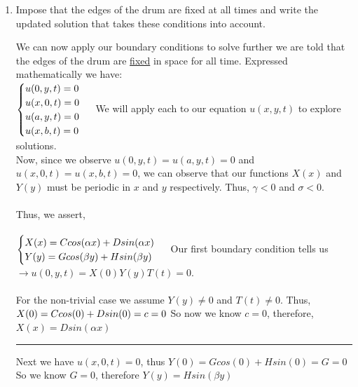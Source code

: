 \documentclass[fleqn]{article}
\begin{document}
\begin{enumerate}
\begin{enumerate}
    \item Impose that the edges of the drum are fixed at all times and write the updated solution that takes these conditions into account.

      \textcolor{hwColor}{ 
         We can now apply our boundary conditions to solve further we are told that the edges of the drum are \underline{fixed}
         in space for all time. Expressed mathematically we have: \\
         $
          \begin{cases}
            u(0,y,t)=0 \\
            u(x,0,t)=0 \\
            u(a,y,t)=0 \\
            u(x,b,t)=0
          \end{cases} \\
         $
         We will apply each to our equation $u(x,y,t)$ to explore solutions. \\
         Now, since we observe $u(0,y,t)=u(a,y,t)=0$ and $u(x,0,t)=u(x,b,t)=0$, we can observe that our functions $X(x)$ and $Y(y)$
         must be periodic in $x$ and $y$ respectively. Thus, $\gamma <0$ and $\sigma <0$. \\
         \\
         Thus, we assert, \\
         \\
         $
          \begin{cases}
            X(x)=C cos(\alpha x)+D sin(\alpha x) \\
            Y(y)=G cos(\beta y)+H sin(\beta y)
          \end{cases} \\
         $
         Our first boundary condition tells us $\rightarrow u(0,y,t)=X(0)Y(y)T(t)=0$. \\
         \\
         For the non-trivial case we assume $Y(y)\neq 0$ and $T(t) \neq 0$. Thus, \\
         $
          X(0)=C cos(0)+D sin(0)=c=0 \\
         $
         So now we know $c=0$, therefore, $X(x)=D sin(\alpha x)$
      }

      \textcolor{hwColor}{ 
        \rule{16cm}{1pt} 
      }

      \textcolor{hwColor}{ 
        Next we have $u(x,0,t)=0$, thus $Y(0)=G cos(0)+H sin(0)=G=0$ \\
        So we know $G=0$, therefore $Y(y)=Hsin(\beta y)$
      }


\end{enumerate}
\end{enumerate}
\end{document}
